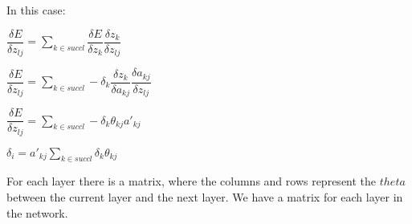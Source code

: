 In this case:

\(\dfrac{\delta E}{\delta z_{lj}}=\sum_{k\in succ{l}}\dfrac{\delta E}{\delta z_{k}}\dfrac{\delta z_{k}}{\delta z_{lj}}\)

\(\dfrac{\delta E}{\delta z_{lj}}=\sum_{k\in succ{l}}-\delta_{k}\dfrac{\delta z_{k}}{\delta a_{kj}}\dfrac{\delta a_{kj}}{\delta z_{lj}}\)

\(\dfrac{\delta E}{\delta z_{lj}}=\sum_{k\in succ{l}}-\delta_{k}\theta_{kj}a'_{kj}\)

\(\delta_i=a'_{kj}\sum_{k\in succ{l}}\delta_{k}\theta_{kj}\)

For each layer there is a matrix, where the columns and rows represent the \(theta \) between the current layer and the next layer. We have a matrix for each layer in the network.

